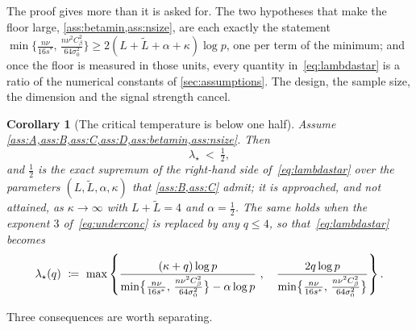 \documentclass[aos]{imsart}
\newcommand{\Ltil}{\widetilde{L}}
\newcommand{\gainfloorsm}{%
    \min\bigl\{\tfrac{n\nu}{16s^{\ast}},\,
    \tfrac{n\nu^{2}C_\beta^{2}}{64\sigma_0^{2}}\bigr\}}
\theoremstyle{plain}
\newtheorem{corollary}{Corollary}[section]
\theoremstyle{definition}
\begin{document}
    The proof gives more than it is asked for. The two hypotheses that make
    the floor large, \cref{ass:betamin,ass:nsize}, are each exactly the
    statement $\gainfloorsm\geq2(L+\Ltil+\alpha+\kappa)\log p$, one per term
    of the minimum; and once the floor is measured in those units, every
    quantity in~\eqref{eq:lambdastar} is a ratio of the numerical constants
    of \cref{sec:assumptions}. The design, the sample size, the dimension and
    the signal strength cancel.

    \begin{corollary}[The critical temperature is below one half]
        \label{cor:half}
        Assume \cref{ass:A,ass:B,ass:C,ass:D,ass:betamin,ass:nsize}. Then
        \begin{equation}
            \label{eq:half}
            \lambda_\star\ <\ \tfrac12 ,
        \end{equation}
        and $\tfrac12$ is the exact supremum of the right-hand side
        of~\eqref{eq:lambdastar} over the parameters $(L,\Ltil,\alpha,\kappa)$
        that \cref{ass:B,ass:C} admit; it is approached, and not attained, as
        $\kappa\to\infty$ with $L+\Ltil=4$ and $\alpha=\tfrac12$. The same
        holds when the exponent $3$ of~\eqref{eq:underconc} is replaced by any
        $q\leq4$, so that~\eqref{eq:lambdastar} becomes
        \begin{equation}
            \label{eq:lambdastarq}
            \lambda_\star(q)\ \coloneq\ \max\left\{
            \frac{(\kappa+q)\log p}{\gainfloorsm-\alpha\log p}\ ,\quad
            \frac{2q\log p}{\gainfloorsm}\right\} .
        \end{equation}
    \end{corollary}

    Three consequences are worth separating.
\end{document}
